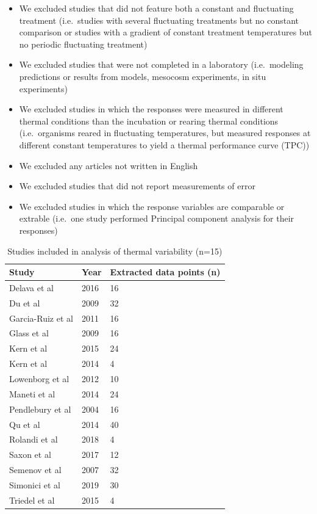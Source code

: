 \documentclass[12pt,twoside]{reedthesis}
\providecommand{\tightlist}{%
  \setlength{\itemsep}{0pt}\setlength{\parskip}{0pt}}
\begin{document}
\begin{itemize}
\tightlist
\item
  We excluded studies that did not feature both a constant and fluctuating treatment (i.e.~studies with several fluctuating treatments but no constant comparison or studies with a gradient of constant treatment temperatures but no periodic fluctuating treatment)
\item
  We excluded studies that were not completed in a laboratory (i.e.~modeling predictions or results from models, mesocosm experiments, in situ experiments)
\item
  We excluded studies in which the responses were measured in different thermal conditions than the incubation or rearing thermal conditions (i.e.~organisms reared in fluctuating temperatures, but measured responses at different constant temperatures to yield a thermal performance curve (TPC))
\item
  We excluded any articles not written in English
\item
  We excluded studies that did not report measurements of error
\item
  We excluded studies in which the response variables are comparable or extrable (i.e.~one study performed Principal component analysis for their responses)
\end{itemize}
\begin{table}

\caption{\label{tab:unnamed-chunk-8}Studies included in analysis of thermal variability (n=15)}
\centering
\begin{tabular}[t]{lll}
\toprule
\textbf{Study} & \textbf{Year} & \textbf{Extracted data points (n)}\\
\midrule
Delava et al & 2016 & 16\\
Du et al & 2009 & 32\\
Garcia-Ruiz et al & 2011 & 16\\
Glass et al & 2009 & 16\\
Kern et al & 2015 & 24\\
\addlinespace
Kern et al & 2014 & 4\\
Lowenborg et al & 2012 & 10\\
Maneti et al & 2014 & 24\\
Pendlebury et al & 2004 & 16\\
Qu et al & 2014 & 40\\
\addlinespace
Rolandi et al & 2018 & 4\\
Saxon et al & 2017 & 12\\
Semenov et al & 2007 & 32\\
Simonici et al & 2019 & 30\\
Triedel et al & 2015 & 4\\
\bottomrule
\end{tabular}
\end{table}
\end{document}
